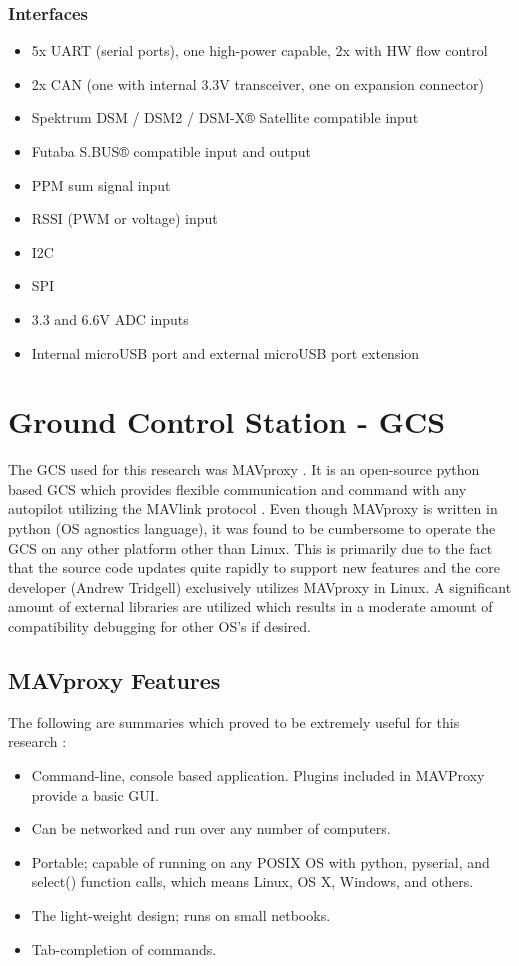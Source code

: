 \subsubsection{Interfaces}
\begin{itemize}
\item 5x UART (serial ports), one high-power capable, 2x with HW flow control
\item 2x CAN (one with internal 3.3V transceiver, one on expansion connector)
\item Spektrum DSM / DSM2 / DSM-X® Satellite compatible input
\item Futaba S.BUS® compatible input and output
\item PPM sum signal input
\item RSSI (PWM or voltage) input
\item I2C
\item SPI
\item 3.3 and 6.6V ADC inputs
\item Internal microUSB port and external microUSB port extension
\end{itemize}

\section{Ground Control Station - \ac{GCS}}

The \ac{GCS} used for this research was MAVproxy \cite{mavproxy}.  It is an open-source python based \ac{GCS} which provides flexible communication and command with any autopilot utilizing the MAVlink protocol \cite{mavlink}.  Even though MAVproxy is written in python (\ac{OS} agnostics language), it was found to be cumbersome to operate the \ac{GCS} on any other platform other than Linux.  This is primarily due to the fact that the source code updates quite rapidly to support new features and the core developer (Andrew Tridgell) exclusively utilizes MAVproxy in Linux.  A significant amount of external libraries are utilized which results in a moderate amount of compatibility debugging for other \ac{OS}'s if desired.

\subsection{MAVproxy Features}
The following are summaries which proved to be extremely useful for this research \cite{mavproxy_wiki}:
\begin{itemize}
\item Command-line, console based application. Plugins included in MAVProxy provide a basic \ac{GUI}.
\item Can be networked and run over any number of computers.
\item Portable; capable of running on any POSIX OS with python, pyserial, and select() function calls, which means Linux, OS X, Windows, and others.
\item The light-weight design; runs on small netbooks.
\item Tab-completion of commands.
\end{itemize}

